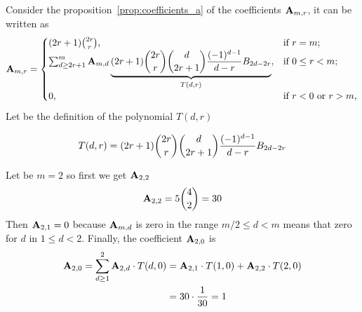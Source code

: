 Consider the proposition~\eqref{prop:coefficients_a} of the coefficients ${\mathbf{A}} \sb{m,r}$,
it can be written as
\begin{equation*}
    {\mathbf{A}} \sb{m,r} =
    \begin{cases}
    (2r+1)
        \binom{2r}{r}, & \text{if } r=m; \\
        \sum_{d \geq 2r+1}^{m} {\mathbf{A}} \sb{m,d} \underbrace{(2r+1) \binom{2r}{r} \binom{d}{2r+1} \frac{(-1)^{d-1}}{d-r} {B}\sb{2d-2r}}_{T(d,r)}, & \text{if } 0 \leq r<m; \\
        0, & \text{if } r<0 \text{ or } r>m,
    \end{cases}
\end{equation*}
Let be the definition of the polynomial $T(d,r)$
\begin{definition}
    \begin{equation*}
        T(d,r) = (2r+1) \binom{2r}{r} \binom{d}{2r+1} \frac{(-1)^{d-1}}{d-r} {B}\sb{2d-2r}
    \end{equation*}
\end{definition}
\begin{example}
    Let be $m=2$ so first we get ${\mathbf{A}} \sb{2,2}$
    \begin{equation*}
        {\mathbf{A}} \sb{2,2} = 5\binom{4}{2}=30
    \end{equation*}
    Then ${\mathbf{A}} \sb{2,1} = 0$ because ${\mathbf{A}} \sb{m,d}$ is zero in the range $m/2 \leq d < m$ means that zero for $d$
    in $1 \leq d < 2$.
    Finally, the coefficient ${\mathbf{A}} \sb{2,0}$ is
    \begin{equation*}
        \begin{split}
            {\mathbf{A}} \sb{2,0}
            = \sum_{d \geq 1}^{2} {\mathbf{A}} \sb{2,d} \cdot T(d, 0)
            &= {\mathbf{A}} \sb{2,1} \cdot T(1, 0) + {\mathbf{A}} \sb{2,2} \cdot T(2, 0) \\
            &= 30 \cdot \frac{1}{30} = 1
        \end{split}
    \end{equation*}
\end{example}
